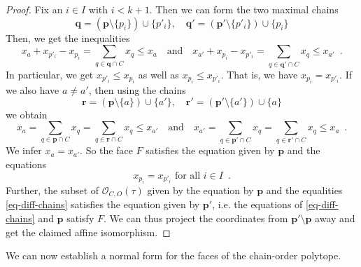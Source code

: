 \documentclass[12pt,a4paper]{amsart}
\theoremstyle{definition}
\newcommand{\OP}{\mathcal{O}}
\begin{document}
\begin{proof}
Fix an $i\in I$ with $i<k+1$. Then we can form the two maximal chains
\begin{equation*}
    \mathbf{q}=(\mathbf{p}\setminus\{p_i\})\cup\{p'_i\},\hspace{1em}\mathbf{q}'=(\mathbf{p}'\setminus\{p'_i\})\cup\{p_i\}
\end{equation*}
Then, we get the inequalities
\[
  x_a+x_{p'_{i}}-x_{p_{i}}=\sum\limits_{q\in\mathbf{q}\cap C}x_q\leq x_a \quad \text{and} \quad  x_{a'}+x_{p_{i}}-x_{p'_{i}}=\sum\limits_{q\in\mathbf{q}'\cap C}x_q\leq x_{a'} \enspace .
\]
In particular, we get $x_{p'_{i}}\leq x_{p_{i}}$ as well as $x_{p_{i}}\leq x_{p'_{i}}$. 
That is, we have $x_{p_{i}}=x_{p'_{i}}$. 
If we also have $a\neq a'$, then using the chains
\begin{equation*}
    \mathbf{r}=(\mathbf{p}\setminus\{a\})\cup\{a'\},\hspace{1em}\mathbf{r}'=(\mathbf{p}'\setminus\{a'\})\cup\{a\}
\end{equation*}
we obtain
\[
  x_a=\sum\limits_{q\in\mathbf{p}\cap C}x_q=\sum\limits_{q\in\mathbf{r}\cap C}x_q\leq x_{a'} \quad \text{and} \quad  x_{a'}=\sum\limits_{q\in\mathbf{p}'\cap C}x_q=\sum\limits_{q\in\mathbf{r}'\cap C}x_q\leq x_{a} \enspace .
\]
We infer $x_a=x_{a'}$.
So the face $F$ satisfies the equation given by $\mathbf{p}$ and the equations
\begin{equation}\label{eq-diff-chains}
    x_{p_{i}}=x_{p'_{i}}\text{ for all $i\in I$} \enspace .
\end{equation}
Further, the subset of $\OP_{C,O}(\tau)$ given by the equation by $\mathbf{p}$ and the equalities \eqref{eq-diff-chains} satisfies the equation given by $\mathbf{p}'$, i.e. the equations of \eqref{eq-diff-chains} and $\mathbf{p}$ satisfy $F$. 
We can thus project the coordinates from $\mathbf{p}'\setminus\mathbf{p}$ away and get the claimed affine isomorphism.
\end{proof}

We can now establish a normal form for the faces of the chain-order polytope.
\end{document}
